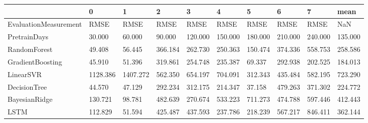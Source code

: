 \begin{tabular}{llllllllll}
\toprule
{} &        0 &        1 &       2 &       3 &       4 &       5 &       6 &       7 &    mean \\
\midrule
EvaluationMeasurement &     RMSE &     RMSE &    RMSE &    RMSE &    RMSE &    RMSE &    RMSE &    RMSE &     NaN \\
PretrainDays          &   30.000 &   60.000 &  90.000 & 120.000 & 150.000 & 180.000 & 210.000 & 240.000 & 135.000 \\
RandomForest          &   49.408 &   56.445 & 366.184 & 262.730 & 250.363 & 150.474 & 374.336 & 558.753 & 258.586 \\
GradientBoosting      &   45.910 &   51.396 & 319.861 & 254.748 & 235.387 &  69.337 & 292.938 & 202.525 & 184.013 \\
LinearSVR             & 1128.386 & 1407.272 & 562.350 & 654.197 & 704.091 & 312.343 & 435.484 & 582.195 & 723.290 \\
DecisionTree          &   44.570 &   47.129 & 292.234 & 312.175 & 214.347 &  37.158 & 479.263 & 371.302 & 224.772 \\
BayesianRidge         &  130.721 &   98.781 & 482.639 & 270.674 & 533.223 & 711.273 & 474.788 & 597.446 & 412.443 \\
LSTM                  &  112.829 &   51.594 & 425.487 & 437.593 & 237.786 & 218.239 & 567.217 & 846.411 & 362.144 \\
\bottomrule
\end{tabular}
